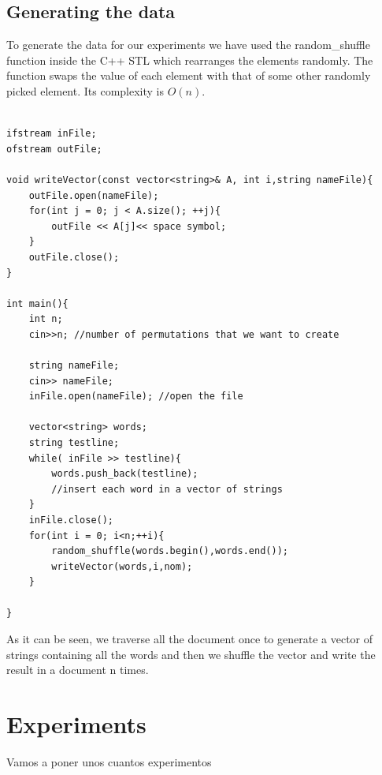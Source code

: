 \documentclass[12pt]{article}
\begin{document}
\subsection{Generating the data}

To generate the data for our experiments we have used the random\_shuffle function inside the C++ STL which rearranges the elements randomly. The function swaps the value of each element with that of some other randomly picked element. Its complexity is $O(n)$. %

\begin{lstlisting}

ifstream inFile;
ofstream outFile;

void writeVector(const vector<string>& A, int i,string nameFile){
    outFile.open(nameFile);
    for(int j = 0; j < A.size(); ++j){
        outFile << A[j]<< space symbol;
    }
    outFile.close();
}

int main(){
    int n; 
    cin>>n; //number of permutations that we want to create
         
    string nameFile;
    cin>> nameFile; 
    inFile.open(nameFile); //open the file
    
    vector<string> words; 
    string testline;
    while( inFile >> testline){
    	words.push_back(testline); 
    	//insert each word in a vector of strings
    }
    inFile.close();
    for(int i = 0; i<n;++i){
    	random_shuffle(words.begin(),words.end()); 
    	writeVector(words,i,nom);
    }
    
}\end{lstlisting}


As it can be seen, we traverse all the document once to generate a vector of strings containing all the words and then we shuffle the vector and write the result in a document n times. \\

\section{Experiments}
Vamos a poner unos cuantos experimentos
\end{document}
